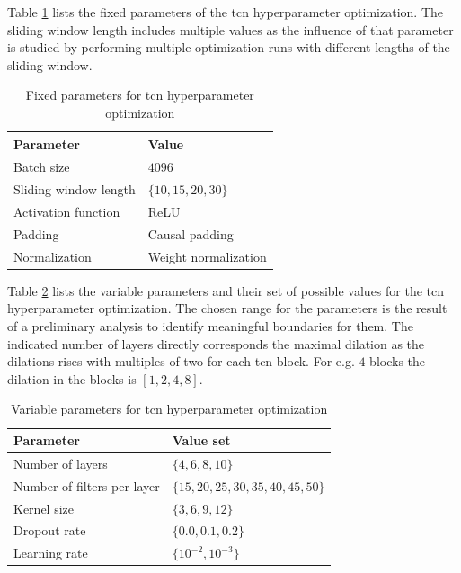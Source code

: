 \documentclass[conference]{IEEEtran}
\begin{document}
Table \ref{tab:fixed_parameters_tcn_optimization} lists the fixed parameters of the \gls{tcn} hyperparameter optimization. The sliding window length includes multiple values as the influence of that parameter is studied by performing multiple optimization runs with different lengths of the sliding window.

\begin{table}[htp]
	\centering
	\caption{Fixed parameters for \gls{tcn} hyperparameter optimization}
	\label{tab:fixed_parameters_tcn_optimization}
	\begin{tabular}{ll}
		\textbf{Parameter} & \textbf{Value} \\
		\hline
		Batch size & $ 4096 $ \\
		Sliding window length & $ \{10, 15, 20, 30\} $ \\
		Activation function & ReLU \\
		Padding & Causal padding \\
		Normalization & Weight normalization
	\end{tabular}
\end{table}

Table \ref{tab:variable_parameters_tcn_optimization} lists the variable parameters and their set of possible values for the \gls{tcn} hyperparameter optimization. The chosen range for the parameters is the result of a preliminary analysis to identify meaningful boundaries for them. The indicated number of layers directly corresponds the maximal dilation as the dilations rises with multiples of two for each \gls{tcn} block. For e.g. $ 4 $ blocks the dilation in the blocks is $ [1, 2, 4, 8] $.

\begin{table}[htp]
	\centering
	\caption{Variable parameters for \gls{tcn} hyperparameter optimization}
	\label{tab:variable_parameters_tcn_optimization}
	\begin{tabular}{ll}
		\textbf{Parameter} & \textbf{Value set} \\
		\hline
		Number of layers & $ \{4, 6, 8, 10\} $ \\
		Number of filters per layer & $ \{15, 20, 25, 30, 35, 40, 45, 50\} $ \\
		Kernel size & $ \{3, 6, 9, 12\} $ \\
		Dropout rate & $ \{0.0, 0.1, 0.2\} $ \\
		Learning rate & $ \{10^{-2}, 10^{-3}\} $
	\end{tabular}
\end{table}
\end{document}

